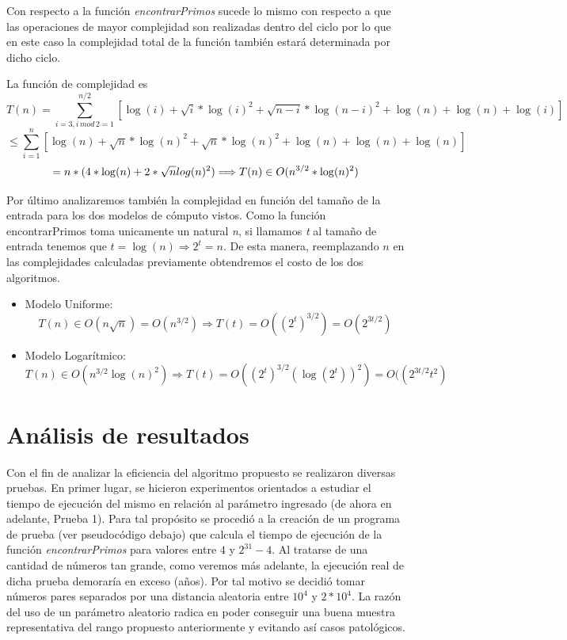 \documentclass[a4paper,10pt] {article}
\begin{document}
\bigskip

Con respecto a la funci\'on \textit{encontrarPrimos} sucede lo mismo con respecto a que
las operaciones de mayor complejidad son realizadas dentro del ciclo por lo que
en este caso la complejidad total de la funci\'on tambi\'en estar\'a determinada
por dicho ciclo.

La funci\'on de complejidad es 
$$ T(n) = \sum_{i=3,i\,mod\,2=1}^{n/2}
[\log(i)+\sqrt{i}*\log(i)^{2}+\sqrt{n-i}*\log(n-i)^{2}+\log(n)+\log(n)+\log(i)] $$
$$ \leq \sum_{i=1}^{n} [\log(n)+\sqrt{n}*\log(n)^{2}+\sqrt{n}*\log(n)^{2}+\log(n)+\log(n)+\log(n)] $$
$$ = n*(4*\log(n)+2*\sqrt{n}\*log(n)^{2}) \Longrightarrow T(n) \in O(n^{3/2}*\log(n)^{2}) $$

\bigskip

Por \'ultimo analizaremos tambi\'en la complejidad en funci\'on del tama\~{n}o
de la entrada para los dos modelos de c\'omputo vistos. Como la funci\'on
encontrarPrimos toma unicamente un natural \textit{n}, si llamamos \textit{t} al
tama\~{n}o de entrada tenemos que $t = \log(n) \Longrightarrow 2^{t} = n$. De
esta manera, reemplazando $n$ en las complejidades calculadas previamente
obtendremos el costo de los dos algoritmos.

\begin{itemize}
\item Modelo Uniforme: 
$$T(n) \in O(n\sqrt{n}) = O(n^{3/2}) \Longrightarrow T(t) = O((2^{t})^{3/2}) =
O(2^{3t/2})$$
\item Modelo Logar\'itmico: 
$$T(n) \in O(n^{3/2}\log(n)^{2}) \Longrightarrow T(t) =
O((2^{t})^{3/2}(\log(2^{t}))^{2}) = O((2^{3t/2}t^{2})$$
\end{itemize}

\section*{An\'alisis de resultados}

Con el fin de analizar la eficiencia del algoritmo propuesto se realizaron diversas pruebas. En primer lugar, se hicieron experimentos orientados a estudiar el tiempo de ejecuci\'on del mismo en relaci\'on al par\'ametro ingresado (de ahora en adelante, Prueba 1). Para tal prop\'osito se procedi\'o a la creaci\'on de un programa de prueba (ver pseudoc\'odigo debajo) que calcula el tiempo de ejecuci\'on de la funci\'on \textit{encontrarPrimos} para valores entre $4$ y $2^{31}-4$. Al tratarse de una cantidad de n\'umeros tan grande, como veremos m\'as adelante, la ejecuci\'on real de dicha prueba demorar\'ia en exceso (a\~{n}os). Por tal motivo se decidi\'o tomar n\'umeros pares separados por una distancia aleatoria entre $10^{4}$ y $2*10^{4}$. La raz\'on del uso de un par\'ametro aleatorio radica en poder conseguir una buena muestra representativa del rango propuesto anteriormente y evitando as\'i casos patol\'ogicos.
\end{document}
